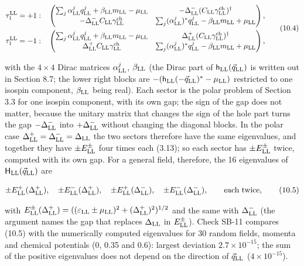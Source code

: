 \documentclass[
  10pt,
]{article}
\begin{document}
\[\begin{aligned}\tau^{\rm LL}_1=+1:&\quad\begin{pmatrix}\sum_j\alpha^j_{\rm LL}q^j_{\rm LL}+\beta_{\rm LL}m_{\rm LL}-\mu_{\rm LL}&-\Delta^-_{\rm LL}(C_{\rm LL}\gamma^{\rm ch}_{\rm LL})^\dagger\\-\Delta^-_{\rm LL}C_{\rm LL}\gamma^{\rm ch}_{\rm LL}&\sum_j(\alpha^j_{\rm LL})^*q^j_{\rm LL}-\beta_{\rm LL}m_{\rm LL}+\mu_{\rm LL}\end{pmatrix},\\\tau^{\rm LL}_1=-1:&\quad\begin{pmatrix}\sum_j\alpha^j_{\rm LL}q^j_{\rm LL}+\beta_{\rm LL}m_{\rm LL}-\mu_{\rm LL}&\Delta^+_{\rm LL}(C_{\rm LL}\gamma^{\rm ch}_{\rm LL})^\dagger\\\Delta^+_{\rm LL}C_{\rm LL}\gamma^{\rm ch}_{\rm LL}&\sum_j(\alpha^j_{\rm LL})^*q^j_{\rm LL}-\beta_{\rm LL}m_{\rm LL}+\mu_{\rm LL}\end{pmatrix},\end{aligned}\tag{10.4}\]

with the \(4\times4\) Dirac matrices \(\alpha^j_{\rm LL}\),
\(\beta_{\rm LL}\) (the Dirac part of
\(\mathsf h_{\rm LL}(\vec q_{\rm LL})\) is written out in Section 8.7;
the lower right blocks are
\(-(\mathsf h_{\rm LL}(-\vec q_{\rm LL})^*-\mu_{\rm LL})\) restricted to
one isospin component, \(\beta_{\rm LL}\) being real). Each sector is
the polar problem of Section 3.3 for one isospin component, with its own
gap; the sign of the gap does not matter, because the unitary matrix
that changes the sign of the hole part turns the gap
\(-\Delta^-_{\rm LL}\) into \(+\Delta^-_{\rm LL}\) without changing the
diagonal blocks. In the polar case
\(\Delta^+_{\rm LL}=\Delta^-_{\rm LL}=\Delta_{\rm LL}\) the two sectors
therefore have the same eigenvalues, and together they have
\(\pm E^\pm_{\rm LL}\) four times each (3.13); so each sector has
\(\pm E^\pm_{\rm LL}\) twice, computed with its own gap. For a general
field, therefore, the 16 eigenvalues of
\(\mathsf H_{\rm LL}(\vec q_{\rm LL})\) are

\[\pm E^+_{\rm LL}(\Delta^+_{\rm LL}),\quad\pm E^-_{\rm LL}(\Delta^+_{\rm LL}),\quad\pm E^+_{\rm LL}(\Delta^-_{\rm LL}),\quad\pm E^-_{\rm LL}(\Delta^-_{\rm LL}),\qquad\text{each twice},\tag{10.5}\]

with
\(E^\pm_{\rm LL}(\Delta^+_{\rm LL})=((\varepsilon_{\rm LL}\pm\mu_{\rm LL})^2+(\Delta^+_{\rm LL})^2)^{1/2}\)
and the same with \(\Delta^-_{\rm LL}\) (the argument names the gap that
replaces \(\Delta_{\rm LL}\) in \(E^\pm_{\rm LL}\)). Check SB-11
compares (10.5) with the numerically computed eigenvalues for 30 random
fields, momenta and chemical potentials (0, 0.35 and 0.6): largest
deviation \(2.7\times10^{-15}\); the sum of the positive eigenvalues
does not depend on the direction of \(\vec q_{\rm LL}\)
(\(4\times10^{-15}\)).
\end{document}
